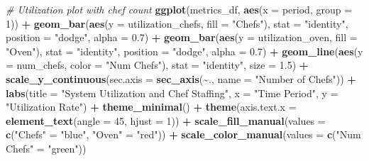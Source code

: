 \documentclass[
]{article}
\newenvironment{Shaded}{\begin{snugshade}}{\end{snugshade}}
\newcommand{\AttributeTok}[1]{\textcolor[rgb]{0.13,0.29,0.53}{#1}}
\newcommand{\CommentTok}[1]{\textcolor[rgb]{0.56,0.35,0.01}{\textit{#1}}}
\newcommand{\DecValTok}[1]{\textcolor[rgb]{0.00,0.00,0.81}{#1}}
\newcommand{\FloatTok}[1]{\textcolor[rgb]{0.00,0.00,0.81}{#1}}
\newcommand{\FunctionTok}[1]{\textcolor[rgb]{0.13,0.29,0.53}{\textbf{#1}}}
\newcommand{\NormalTok}[1]{#1}
\newcommand{\OtherTok}[1]{\textcolor[rgb]{0.56,0.35,0.01}{#1}}
\newcommand{\SpecialCharTok}[1]{\textcolor[rgb]{0.81,0.36,0.00}{\textbf{#1}}}
\newcommand{\StringTok}[1]{\textcolor[rgb]{0.31,0.60,0.02}{#1}}
\begin{document}
\begin{Shaded}
\begin{Highlighting}[]
\CommentTok{\# Utilization plot with chef count}
\FunctionTok{ggplot}\NormalTok{(metrics\_df, }\FunctionTok{aes}\NormalTok{(}\AttributeTok{x =}\NormalTok{ period, }\AttributeTok{group =} \DecValTok{1}\NormalTok{)) }\SpecialCharTok{+}
  \FunctionTok{geom\_bar}\NormalTok{(}\FunctionTok{aes}\NormalTok{(}\AttributeTok{y =}\NormalTok{ utilization\_chefs, }\AttributeTok{fill =} \StringTok{"Chefs"}\NormalTok{), }
           \AttributeTok{stat =} \StringTok{"identity"}\NormalTok{, }\AttributeTok{position =} \StringTok{"dodge"}\NormalTok{, }\AttributeTok{alpha =} \FloatTok{0.7}\NormalTok{) }\SpecialCharTok{+}
  \FunctionTok{geom\_bar}\NormalTok{(}\FunctionTok{aes}\NormalTok{(}\AttributeTok{y =}\NormalTok{ utilization\_oven, }\AttributeTok{fill =} \StringTok{"Oven"}\NormalTok{), }
           \AttributeTok{stat =} \StringTok{"identity"}\NormalTok{, }\AttributeTok{position =} \StringTok{"dodge"}\NormalTok{, }\AttributeTok{alpha =} \FloatTok{0.7}\NormalTok{) }\SpecialCharTok{+}
  \FunctionTok{geom\_line}\NormalTok{(}\FunctionTok{aes}\NormalTok{(}\AttributeTok{y =}\NormalTok{ num\_chefs, }\AttributeTok{color =} \StringTok{"Num Chefs"}\NormalTok{), }
            \AttributeTok{stat =} \StringTok{"identity"}\NormalTok{, }\AttributeTok{size =} \FloatTok{1.5}\NormalTok{) }\SpecialCharTok{+}
  \FunctionTok{scale\_y\_continuous}\NormalTok{(}\AttributeTok{sec.axis =} \FunctionTok{sec\_axis}\NormalTok{(}\SpecialCharTok{\textasciitilde{}}\NormalTok{., }\AttributeTok{name =} \StringTok{"Number of Chefs"}\NormalTok{)) }\SpecialCharTok{+}
  \FunctionTok{labs}\NormalTok{(}\AttributeTok{title =} \StringTok{"System Utilization and Chef Staffing"}\NormalTok{,}
       \AttributeTok{x =} \StringTok{"Time Period"}\NormalTok{,}
       \AttributeTok{y =} \StringTok{"Utilization Rate"}\NormalTok{) }\SpecialCharTok{+}
  \FunctionTok{theme\_minimal}\NormalTok{() }\SpecialCharTok{+}
  \FunctionTok{theme}\NormalTok{(}\AttributeTok{axis.text.x =} \FunctionTok{element\_text}\NormalTok{(}\AttributeTok{angle =} \DecValTok{45}\NormalTok{, }\AttributeTok{hjust =} \DecValTok{1}\NormalTok{)) }\SpecialCharTok{+}
  \FunctionTok{scale\_fill\_manual}\NormalTok{(}\AttributeTok{values =} \FunctionTok{c}\NormalTok{(}\StringTok{"Chefs"} \OtherTok{=} \StringTok{"blue"}\NormalTok{, }\StringTok{"Oven"} \OtherTok{=} \StringTok{"red"}\NormalTok{)) }\SpecialCharTok{+}
  \FunctionTok{scale\_color\_manual}\NormalTok{(}\AttributeTok{values =} \FunctionTok{c}\NormalTok{(}\StringTok{"Num Chefs"} \OtherTok{=} \StringTok{"green"}\NormalTok{))}
\end{Highlighting}
\end{Shaded}
\end{document}
